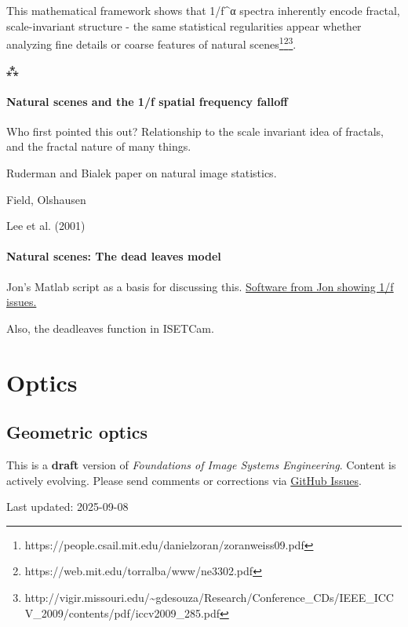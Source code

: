 \documentclass[
  letterpaper,
]{book}
\begin{document}
This mathematical framework shows that 1/f\^{}α spectra inherently
encode fractal, scale-invariant structure - the same statistical
regularities appear whether analyzing fine details or coarse features of
natural scenes\footnote{https://people.csail.mit.edu/danielzoran/zoranweiss09.pdf}\footnote{https://web.mit.edu/torralba/www/ne3302.pdf}\footnote{http://vigir.missouri.edu/\textasciitilde gdesouza/Research/Conference\_CDs/IEEE\_ICCV\_2009/contents/pdf/iccv2009\_285.pdf}.

⁂

\subsection{Natural scenes and the 1/f spatial frequency
falloff}\label{natural-scenes-and-the-1f-spatial-frequency-falloff}

Who first pointed this out? Relationship to the scale invariant idea of
fractals, and the fractal nature of many things.

Ruderman and Bialek paper on natural image statistics.

Field, Olshausen

Lee et al. (2001)

\subsection{Natural scenes: The dead leaves
model}\label{natural-scenes-the-dead-leaves-model}

Jon's Matlab script as a basis for discussing this.
\href{https://github.com/isetbio/isetbio/blob/main/scripts/oneoverf/s_oneOverF1D.m}{Software
from Jon showing 1/f issues.}

Also, the deadleaves function in ISETCam.

\part{Optics}

\chapter{Geometric optics}\label{sec-geometric-optics}

\begin{tcolorbox}[enhanced jigsaw, colframe=quarto-callout-warning-color-frame, titlerule=0mm, rightrule=.15mm, opacitybacktitle=0.6, colback=white, leftrule=.75mm, coltitle=black, title=\textcolor{quarto-callout-warning-color}{\faExclamationTriangle}\hspace{0.5em}{Work in Progress}, bottomrule=.15mm, colbacktitle=quarto-callout-warning-color!10!white, breakable, left=2mm, bottomtitle=1mm, toptitle=1mm, opacityback=0, arc=.35mm, toprule=.15mm]

This is a \textbf{draft} version of \emph{Foundations of Image Systems
Engineering}. Content is actively evolving. Please send comments or
corrections via \href{https://github.com/wandell/FISE-git/issues}{GitHub
Issues}.

Last updated: 2025-09-08

\end{tcolorbox}
\end{document}
